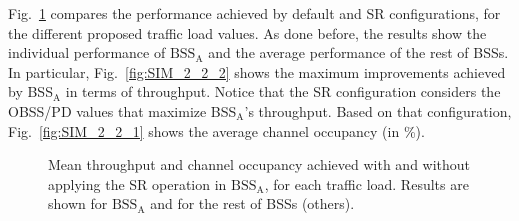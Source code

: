 \documentclass[preprint,12pt]{elsarticle}
\begin{document}
Fig.~\ref{fig:SIM_2_2} compares the performance achieved by default and SR configurations, for the different proposed traffic load values. As done before, the results show the individual performance of $\text{BSS}_\text{A}$ and the average performance of the rest of BSSs. In particular, Fig.~\ref{fig:SIM_2_2_2} shows the maximum improvements achieved by BSS$_\text{A}$ in terms of throughput. Notice that the SR configuration considers the OBSS/PD values that maximize BSS$_\text{A}$'s throughput. Based on that configuration, Fig.~\ref{fig:SIM_2_2_1} shows the average channel occupancy (in \%).

\begin{figure}[ht!]
	\centering		
	\caption{Mean throughput and channel occupancy achieved with and without applying the SR operation in $\text{BSS}_\text{A}$, for each traffic load. Results are shown for $\text{BSS}_\text{A}$ and for the rest of BSSs (others).}
	\label{fig:SIM_2_2}
\end{figure}
\end{document}
